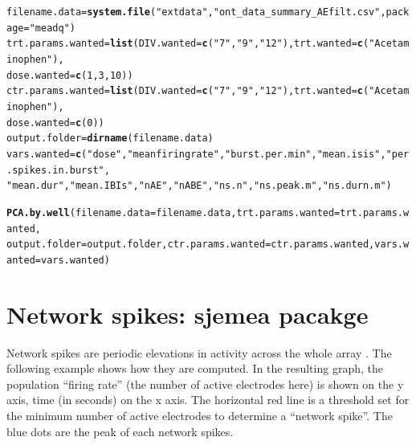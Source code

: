 \documentclass{article}\usepackage[]{graphicx}\usepackage[]{color}
\makeatletter
\newcommand{\hlnum}[1]{\textcolor[rgb]{0.686,0.059,0.569}{#1}}%
\newcommand{\hlstr}[1]{\textcolor[rgb]{0.192,0.494,0.8}{#1}}%
\newcommand{\hlstd}[1]{\textcolor[rgb]{0.345,0.345,0.345}{#1}}%
\newcommand{\hlkwb}[1]{\textcolor[rgb]{0.69,0.353,0.396}{#1}}%
\newcommand{\hlkwc}[1]{\textcolor[rgb]{0.333,0.667,0.333}{#1}}%
\newcommand{\hlkwd}[1]{\textcolor[rgb]{0.737,0.353,0.396}{\textbf{#1}}}%
\newenvironment{kframe}{%
 \def\at@end@of@kframe{}%
 \ifinner\ifhmode%
  \def\at@end@of@kframe{\end{minipage}}%
  \begin{minipage}{\columnwidth}%
 \fi\fi%
 \def\FrameCommand##1{\hskip\@totalleftmargin \hskip-\fboxsep
 \colorbox{shadecolor}{##1}\hskip-\fboxsep
     \hskip-\linewidth \hskip-\@totalleftmargin \hskip\columnwidth}%
 \MakeFramed {\advance\hsize-\width
   \@totalleftmargin\z@ \linewidth\hsize
   \@setminipage}}%
 {\par\unskip\endMakeFramed%
 \at@end@of@kframe}
\newenvironment{knitrout}{}{} %
\makeatother
\begin{document}
\begin{knitrout}
\color{fgcolor}\begin{kframe}
\begin{alltt}
\hlstd{filename.data} \hlkwb{=} \hlkwd{system.file}\hlstd{(}\hlstr{"extdata"}\hlstd{,} \hlstr{"ont_data_summary_AEfilt.csv"}\hlstd{,} \hlkwc{package} \hlstd{=} \hlstr{"meadq"}\hlstd{)}
\hlstd{trt.params.wanted} \hlkwb{=} \hlkwd{list}\hlstd{(}\hlkwc{DIV.wanted} \hlstd{=} \hlkwd{c}\hlstd{(}\hlstr{"7"}\hlstd{,} \hlstr{"9"}\hlstd{,} \hlstr{"12"}\hlstd{),} \hlkwc{trt.wanted} \hlstd{=} \hlkwd{c}\hlstd{(}\hlstr{"Acetaminophen"}\hlstd{),}
    \hlkwc{dose.wanted} \hlstd{=} \hlkwd{c}\hlstd{(}\hlnum{1}\hlstd{,} \hlnum{3}\hlstd{,} \hlnum{10}\hlstd{))}
\hlstd{ctr.params.wanted} \hlkwb{=} \hlkwd{list}\hlstd{(}\hlkwc{DIV.wanted} \hlstd{=} \hlkwd{c}\hlstd{(}\hlstr{"7"}\hlstd{,} \hlstr{"9"}\hlstd{,} \hlstr{"12"}\hlstd{),} \hlkwc{trt.wanted} \hlstd{=} \hlkwd{c}\hlstd{(}\hlstr{"Acetaminophen"}\hlstd{),}
    \hlkwc{dose.wanted} \hlstd{=} \hlkwd{c}\hlstd{(}\hlnum{0}\hlstd{))}
\hlstd{output.folder} \hlkwb{=} \hlkwd{dirname}\hlstd{(filename.data)}
\hlstd{vars.wanted} \hlkwb{=} \hlkwd{c}\hlstd{(}\hlstr{"dose"}\hlstd{,} \hlstr{"meanfiringrate"}\hlstd{,} \hlstr{"burst.per.min"}\hlstd{,} \hlstr{"mean.isis"}\hlstd{,} \hlstr{"per.spikes.in.burst"}\hlstd{,}
    \hlstr{"mean.dur"}\hlstd{,} \hlstr{"mean.IBIs"}\hlstd{,} \hlstr{"nAE"}\hlstd{,} \hlstr{"nABE"}\hlstd{,} \hlstr{"ns.n"}\hlstd{,} \hlstr{"ns.peak.m"}\hlstd{,} \hlstr{"ns.durn.m"}\hlstd{)}

\hlkwd{PCA.by.well}\hlstd{(}\hlkwc{filename.data} \hlstd{= filename.data,} \hlkwc{trt.params.wanted} \hlstd{= trt.params.wanted,}
    \hlkwc{output.folder} \hlstd{= output.folder,} \hlkwc{ctr.params.wanted} \hlstd{= ctr.params.wanted,} \hlkwc{vars.wanted} \hlstd{= vars.wanted)}
\end{alltt}
\end{kframe}
\end{knitrout}














\section*{Network spikes: sjemea pacakge }

Network spikes are periodic elevations in activity across the whole
array \citep{Eytan2006}.  The following example shows how they are computed.
In the resulting graph, the population ``firing rate'' (the number of
active electrodes here) is shown on the y axis, time (in seconds) on
the x axis.  The horizontal red line is a threshold set for the
minimum number of active electrodes to determine a ``network spike''.
The blue dots are the peak of each network spikes.
\end{document}
